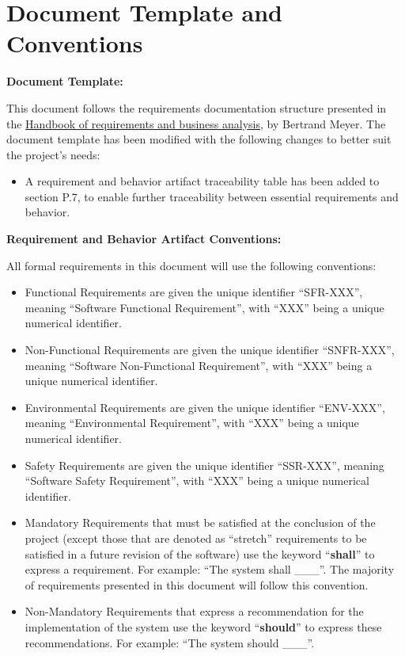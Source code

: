 \documentclass{scrreprt}
\newcounter{ENV}
\newcounter{SFR}
\newcounter{SNFR}
\newcounter{SSR}
\theoremstyle{definition}
\begin{document}
	\chapter*{Document Template and Conventions}
	
	\textbf{Document Template:}\newline
	
	\noindent This document follows the requirements documentation structure 
	presented in the 
	\href{https://link.springer.com/content/pdf/10.1007/978-3-031-06739-6.pdf}{Handbook
	of requirements and business analysis}, by Bertrand Meyer. The document 
	template has been modified with the following changes to 
	better suit the project's needs:
	
	\begin{itemize}
		\item A requirement and behavior artifact traceability table has been 
		added to section P.7, to enable further traceability between essential 
		requirements and behavior.
	\end{itemize}
	
	\noindent \textbf{Requirement and Behavior Artifact Conventions:}\newline
	
	\noindent All formal requirements in this document will use the following 
	conventions:
	
	\begin{itemize}
		\item Functional Requirements are given the unique identifier 
		``SFR-XXX'', meaning ``Software Functional Requirement'', with ``XXX'' 
		being 
		a unique numerical identifier.
		\item Non-Functional Requirements are given the unique identifier 
		``SNFR-XXX'', meaning ``Software Non-Functional Requirement'', with 
		``XXX'' 
		being a unique numerical identifier.
		\item Environmental Requirements are given the unique identifier 
		``ENV-XXX'', meaning ``Environmental Requirement'', with ``XXX'' being 
		a 
		unique numerical identifier.
		\item Safety Requirements are given the unique identifier 
		``SSR-XXX'', meaning ``Software Safety Requirement'', with ``XXX'' 
		being 
		a 
		unique numerical identifier.
		\item Mandatory Requirements that must be satisfied at the conclusion 
		of the project (except those that are denoted as ``stretch'' 
		requirements 
		to be satisfied in a future revision of the software) use the keyword 
		``\textbf{shall}'' to express a requirement. For example: ``The system 
		shall \_\_\_''. The majority of requirements presented in this document 
		will follow this convention.
		\item Non-Mandatory Requirements that express a recommendation for the 
		implementation of the system use the keyword ``\textbf{should}'' to 
		express these recommendations. For example: ``The system should 
		\_\_\_''.
	\end{itemize}
	
\end{document}
